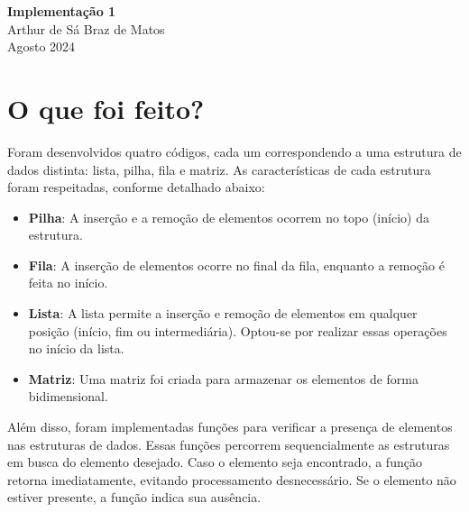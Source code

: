 \documentclass{article}
\begin{document}
\begin{center}
    \Large\textbf{Implementação 1} \\
    \large Arthur de Sá Braz de Matos \\
    \normalsize Agosto 2024
\end{center}

\vspace{1cm} %

\section{O que foi feito?}
Foram desenvolvidos quatro códigos, cada um correspondendo a uma estrutura de dados distinta: lista, pilha, fila e matriz. As características de cada estrutura foram respeitadas, conforme detalhado abaixo:

\begin{itemize}
    \item \textbf{Pilha}: A inserção e a remoção de elementos ocorrem no topo (início) da estrutura.
    \item \textbf{Fila}: A inserção de elementos ocorre no final da fila, enquanto a remoção é feita no início.
    \item \textbf{Lista}: A lista permite a inserção e remoção de elementos em qualquer posição (início, fim ou intermediária). Optou-se por realizar essas operações no início da lista.
    \item \textbf{Matriz}: Uma matriz foi criada para armazenar os elementos de forma bidimensional.
\end{itemize}

Além disso, foram implementadas funções para verificar a presença de elementos nas estruturas de dados. Essas funções percorrem sequencialmente as estruturas em busca do elemento desejado. Caso o elemento seja encontrado, a função retorna imediatamente, evitando processamento desnecessário. Se o elemento não estiver presente, a função indica sua ausência.
\end{document}
